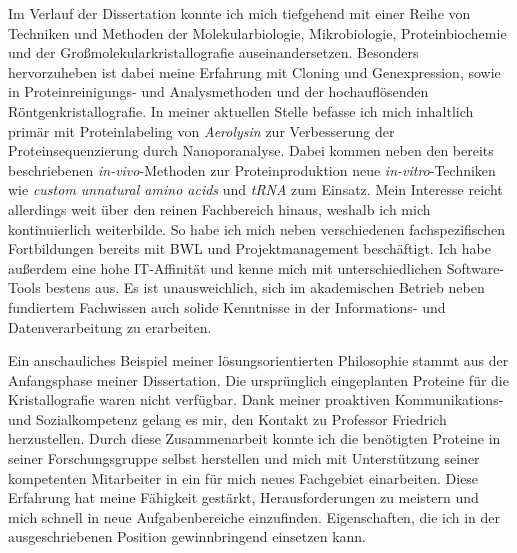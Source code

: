     {Im Verlauf der Dissertation konnte ich mich tiefgehend mit einer Reihe von Techniken und Methoden der Molekularbiologie, Mikrobiologie, Proteinbiochemie und der Großmolekularkristallografie auseinandersetzen. Besonders hervorzuheben ist dabei meine Erfahrung 
    mit Cloning und Genexpression, sowie in Proteinreinigungs- und Analysmethoden und der hochauflösenden Röntgenkristallografie. In meiner aktuellen Stelle befasse ich mich inhaltlich primär mit Proteinlabeling von \textit{Aerolysin} zur Verbesserung der Proteinsequenzierung durch Nanoporanalyse. Dabei kommen neben den bereits beschriebenen \textit{in-vivo}-Methoden zur Proteinproduktion neue \textit{in-vitro}-Techniken wie \textit{custom unnatural amino acids} und \textit{tRNA} zum Einsatz.} Mein Interesse reicht allerdings weit über den reinen Fachbereich hinaus, weshalb ich mich kontinuierlich weiterbilde. So habe ich mich neben verschiedenen fachspezifischen Fortbildungen bereits mit BWL und Projektmanagement beschäftigt. Ich habe außerdem eine hohe IT-Affinität und kenne mich mit unterschiedlichen Software-Tools bestens aus. Es ist unausweichlich, sich im akademischen Betrieb neben fundiertem Fachwissen auch solide Kenntnisse in der Informations- und Datenverarbeitung zu erarbeiten.
    \par 

Ein anschauliches Beispiel meiner lösungsorientierten Philosophie stammt aus der Anfangsphase meiner Dissertation. Die ursprünglich eingeplanten Proteine für die Kristallografie waren nicht verfügbar. Dank meiner proaktiven Kommunikations- und Sozialkompetenz gelang es mir, den Kontakt zu Professor Friedrich herzustellen.  Durch diese Zusammenarbeit konnte ich die benötigten Proteine in seiner Forschungsgruppe selbst herstellen und mich mit Unterstützung seiner kompetenten Mitarbeiter in ein für mich neues Fachgebiet einarbeiten. Diese Erfahrung hat meine Fähigkeit gestärkt, Herausforderungen zu meistern und mich schnell in neue Aufgabenbereiche einzufinden. Eigenschaften, die ich in der ausgeschriebenen Position gewinnbringend einsetzen kann.\par

